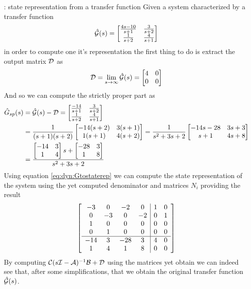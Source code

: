 		\begin{example}{: state representation from a transfer function}
			Given a system characterized by a transfer function
			\[ \hat {\mathcal{G}}(s) = \begin{bmatrix} \frac{4s-10}{s+1} & \frac{3}{s+2} \\ \frac{1}{s+2} & \frac{4}{s+1}  \end{bmatrix} \]
			in order to compute one it's representation the first thing to do is extract the output matrix $\mathcal{D}$ as
			\[ \mathcal{D} = \lim_{s\rightarrow \infty} \hat {\mathcal{G}}(s) = \begin{bmatrix} 4 & 0 \\ 0 & 0 \end{bmatrix} \]
			And so we can compute the strictly  proper part as
			\begin{align*}
				\hat G_{sp}(s) & = \hat {\mathcal{G}}(s) - \mathcal{D} = \begin{bmatrix} \frac{-14}{s+1} & \frac{3}{s+2} \\ \frac{1}{s+2} & \frac{4}{s+1}  \end{bmatrix} \\
				& = \frac 1 {(s+1)(s+2)} \begin{bmatrix} -14(s+2) & 3 (s+1) \\ 1(s+1) & 4(s+2) \end{bmatrix} = \frac 1{s^2 + 3s + 2} \begin{bmatrix} -14 s - 28 & 3s + 3 \\ s+1 & 4s + 8 \end{bmatrix} \\
				& = \frac{\begin{bmatrix} -14 & 3 \\ 1 & 4 \end{bmatrix}s + \begin{bmatrix} -28 & 3 \\ 1 & 8 \end{bmatrix} }{s^2 + 3s +2}
			\end{align*}
			Using equation \ref{eq:dyn:Gtostaterep} we can compute the state representation of the system using the yet computed denominator and matrices $N_i$ providing the result
			\[ \begin{bmatrix} \begin{array}{c c c c | c c}
				-3 & 0 & -2 & 0 & 1 & 0 \\
				0 & -3 & 0 & -2 & 0 & 1 \\
				1 & 0 & 0 & 0 & 0 & 0 \\
				0 & 1 & 0 & 0 & 0 & 0 \\ \hline
				-14 & 3 & -28 & 3 & 4 & 0 \\ 
				1 & 4 & 1 & 8 & 0 & 0
			\end{array} \end{bmatrix} \]
			By computing $\mathcal{C} (s\mathcal{I} - \mathcal{A})^{-1} \mathcal{B} + \mathcal{D}$ using the matrices yet obtain we can indeed see that, after some simplifications, that we obtain the original transfer function $\hat {\mathcal{G}}(s)$.
		\end{example}
		
